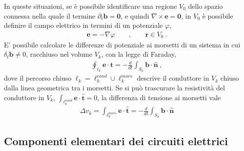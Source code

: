 \documentclass[letterpaper,10pt,english]{jupyterBook}
\begin{document}
\sphinxAtStartPar
In queste situazioni, se è possibile identificare una regione \(V_0\) dello spazio connessa nella quale il termine \(\partial_t \mathbf{b} = \mathbf{0}\), e quindi \(\nabla \times \mathbf{e} = \mathbf{0}\), in \(V_0\) è possibile definire il campo elettrico in termini di un potenziale \(\varphi\),
\begin{equation*}
\begin{split}\mathbf{e} = - \nabla \varphi \qquad , \qquad \mathbf{r} \in V_0 \ .\end{split}
\end{equation*}
\sphinxAtStartPar
E’ possibile calcolare le differenze di potenziale ai morsetti di un sistema in cui \(\delta_t \mathbf{b} \ne 0\), racchiuso nel volume \(V_k\), con la legge di Faraday,
\begin{equation*}
\begin{split}\oint_{\ell_k} \mathbf{e} \cdot \hat{\mathbf{t}} = - \frac{d}{dt} \int_{S_k} \mathbf{b} \cdot \hat{\mathbf{n}} \ ,\end{split}
\end{equation*}
\sphinxAtStartPar
dove il percorso chiuso \(\ell_k = \ell_k^{cond} \cup \ell_k^{mors}\) descrive il conduttore in \(V_k\) chiuso dalla linea geometrica tra i morsetti. Se si può trascurare la resistività del conduttore in \(V_k\), \(\int_{\ell_k^{cond}} \mathbf{e} \cdot \hat{\mathbf{t}} = 0\), la differenza di tensione ai morsetti vale
\begin{equation*}
\begin{split}\Delta v_k = \int_{\ell^{mors}_k} \mathbf{e} \cdot \hat{\mathbf{t}} = - \frac{d}{dt} \int_{S_k} \mathbf{b} \cdot \hat{\mathbf{n}}\end{split}
\end{equation*}
\sphinxstepscope




\subsection{Componenti elementari dei circuiti elettrici}
\label{\detokenize{ch/circuits-electric-components:componenti-elementari-dei-circuiti-elettrici}}\label{\detokenize{ch/circuits-electric-components:classical-electromagnetism-circuits-electric-components}}\label{\detokenize{ch/circuits-electric-components::doc}}
\end{document}
